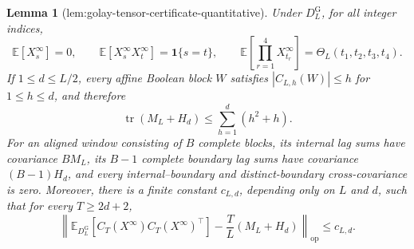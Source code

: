 \documentclass{article}
\newtheorem{lemma}{Lemma}
\begin{document}
\begin{lemma}[lem:golay-tensor-certificate-quantitative]\label{lem:golay-tensor-certificate-quantitative}
Under \(D_L^{\mathrm G}\), for all integer indices,
\[
\mathbb E[X_s^{\infty}]=0,\qquad
\mathbb E[X_s^{\infty}X_t^{\infty}]=\mathbf 1\{s=t\},\qquad
\mathbb E\!\left[\prod_{r=1}^4X_{t_r}^{\infty}\right]
=\Theta_L(t_1,t_2,t_3,t_4).
\]
If \(1\le d\le L/2\), every affine Boolean block \(W\) satisfies \(|C_{L,h}(W)|\le h\) for \(1\le h\le d\), and therefore
\[
\operatorname{tr}(M_L+H_d)\le \sum_{h=1}^d(h^2+h).
\]
For an aligned window consisting of \(B\) complete blocks, its internal lag sums have covariance \(BM_L\), its \(B-1\) complete boundary lag sums have covariance \((B-1)H_d\), and every internal--boundary and distinct-boundary cross-covariance is zero.  Moreover, there is a finite constant \(c_{L,d}\), depending only on \(L\) and \(d\), such that for every \(T\ge 2d+2\),
\[
\left\|\mathbb E_{D_L^{\mathrm G}}\!\left[C_T(X^{\infty})C_T(X^{\infty})^{\top}\right]
-\frac{T}{L}(M_L+H_d)\right\|_{\mathrm{op}}\le c_{L,d}.
\]
\end{lemma}
\end{document}
